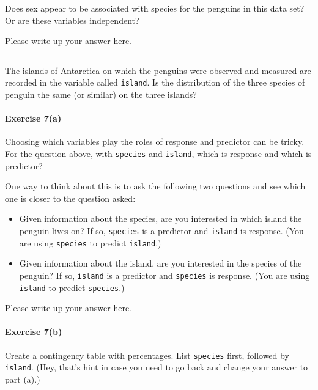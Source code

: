 \documentclass[
]{book}
\providecommand{\tightlist}{%
  \setlength{\itemsep}{0pt}\setlength{\parskip}{0pt}}
\begin{document}
Does sex appear to be associated with species for the penguins in this data set? Or are these variables independent?

Please write up your answer here.

\begin{center}\rule{0.5\linewidth}{0.5pt}\end{center}

The islands of Antarctica on which the penguins were observed and measured are recorded in the variable called \texttt{island}. Is the distribution of the three species of penguin the same (or similar) on the three islands?

\hypertarget{exercise-7a}{%
\paragraph*{Exercise 7(a)}\label{exercise-7a}}

Choosing which variables play the roles of response and predictor can be tricky. For the question above, with \texttt{species} and \texttt{island}, which is response and which is predictor?

One way to think about this is to ask the following two questions and see which one is closer to the question asked:

\begin{itemize}
\tightlist
\item
  Given information about the species, are you interested in which island the penguin lives on? If so, \texttt{species} is a predictor and \texttt{island} is response. (You are using \texttt{species} to predict \texttt{island}.)
\item
  Given information about the island, are you interested in the species of the penguin? If so, \texttt{island} is a predictor and \texttt{species} is response. (You are using \texttt{island} to predict \texttt{species}.)
\end{itemize}

Please write up your answer here.

\hypertarget{exercise-7b}{%
\paragraph*{Exercise 7(b)}\label{exercise-7b}}

Create a contingency table with percentages. List \texttt{species} first, followed by \texttt{island}. (Hey, that's hint in case you need to go back and change your answer to part (a).)
\end{document}
